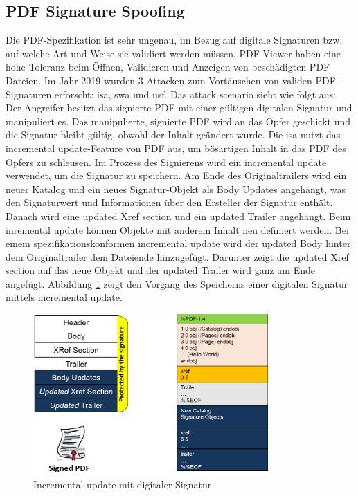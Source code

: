 \subsection{PDF Signature Spoofing}
Die PDF-Spezifikation ist sehr ungenau, im Bezug auf digitale Signaturen bzw. auf welche Art und Weise sie validiert werden müssen. PDF-Viewer haben eine hohe Toleranz beim Öffnen, Validieren und Anzeigen von beschädigten PDF-Dateien. Im Jahr 2019 wurden 3 Attacken zum Vortäuschen von validen PDF-Signaturen erforscht: \gls{isa}, \gls{swa} und \gls{usf}. Das attack scenario sieht wie folgt aus: Der Angreifer besitzt das signierte PDF mit einer gültigen digitalen Signatur und manipuliert es. Das manipulierte, signierte PDF wird an das Opfer geschickt und die Signatur bleibt gültig, obwohl der Inhalt geändert wurde. Die \gls{isa} nutzt das incremental update-Feature von PDF aus, um bösartigen Inhalt in das PDF des Opfers zu schleusen. Im Prozess des Signierens wird ein incremental update verwendet, um die Signatur zu speichern. Am Ende des Originaltrailers wird ein neuer Katalog und ein neues Signatur-Objekt als Body Updates angehängt, was den Signaturwert und Informationen über den Ersteller der Signatur enthält. Danach wird eine updated Xref section und ein updated Trailer angehängt. Beim inremental update können Objekte mit anderem Inhalt neu definiert werden. Bei einem spezifikationskonformen incremental update wird der updated Body hinter dem Originaltrailer dem Dateiende hinzugefügt. Darunter zeigt die updated Xref section auf das neue Objekt und der updated Trailer wird ganz am Ende angefügt. Abbildung \ref{fig:incr-update} zeigt den Vorgang des Speicherns einer digitalen Signatur mittels incremental update.

\begin{figure}[!htbp]
	\centering
	\includegraphics[width=0.8\textwidth]{"images/dig_sig_incr_up.png"}
	\caption{Incremental update mit digitaler Signatur \cite{ccc-break-pdf-slides}}
	\label{fig:incr-update}
\end{figure}

